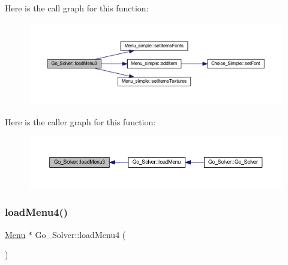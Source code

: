 Here is the call graph for this function\+:
\nopagebreak
\begin{figure}[H]
\begin{center}
\leavevmode
\includegraphics[width=350pt]{class_go___solver_a48def38f87effdb973b5f02329a0af4f_cgraph}
\end{center}
\end{figure}
Here is the caller graph for this function\+:
\nopagebreak
\begin{figure}[H]
\begin{center}
\leavevmode
\includegraphics[width=350pt]{class_go___solver_a48def38f87effdb973b5f02329a0af4f_icgraph}
\end{center}
\end{figure}
\mbox{\label{class_go___solver_a99b82aef6960441ba24e3b28c7ec9ad5}} 
\subsubsection{\texorpdfstring{load\+Menu4()}{loadMenu4()}}
{\footnotesize\ttfamily \hyperlink{class_menu}{Menu} $\ast$ Go\+\_\+\+Solver\+::load\+Menu4 (\begin{DoxyParamCaption}{ }\end{DoxyParamCaption})\hspace{0.3cm}{\ttfamily [static]}}


